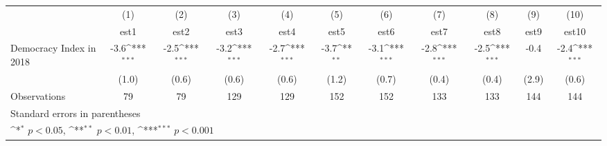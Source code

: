 {
\def\sym#1{\ifmmode^{#1}\else\(^{#1}\)\fi}
\begin{tabular}{l*{10}{c}}
\hline\hline
                    &\multicolumn{1}{c}{(1)}         &\multicolumn{1}{c}{(2)}         &\multicolumn{1}{c}{(3)}         &\multicolumn{1}{c}{(4)}         &\multicolumn{1}{c}{(5)}         &\multicolumn{1}{c}{(6)}         &\multicolumn{1}{c}{(7)}         &\multicolumn{1}{c}{(8)}         &\multicolumn{1}{c}{(9)}         &\multicolumn{1}{c}{(10)}         \\
                    &        est1         &        est2         &        est3         &        est4         &        est5         &        est6         &        est7         &        est8         &        est9         &       est10         \\
\hline
Democracy Index in 2018&        -3.6\sym{***}&        -2.5\sym{***}&        -3.2\sym{***}&        -2.7\sym{***}&        -3.7\sym{**} &        -3.1\sym{***}&        -2.8\sym{***}&        -2.5\sym{***}&        -0.4         &        -2.4\sym{***}\\
                    &       (1.0)         &       (0.6)         &       (0.6)         &       (0.6)         &       (1.2)         &       (0.7)         &       (0.4)         &       (0.4)         &       (2.9)         &       (0.6)         \\
\hline
Observations        &          79         &          79         &         129         &         129         &         152         &         152         &         133         &         133         &         144         &         144         \\
\hline\hline
\multicolumn{11}{l}{\footnotesize Standard errors in parentheses}\\
\multicolumn{11}{l}{\footnotesize \sym{*} \(p<0.05\), \sym{**} \(p<0.01\), \sym{***} \(p<0.001\)}\\
\end{tabular}
}
